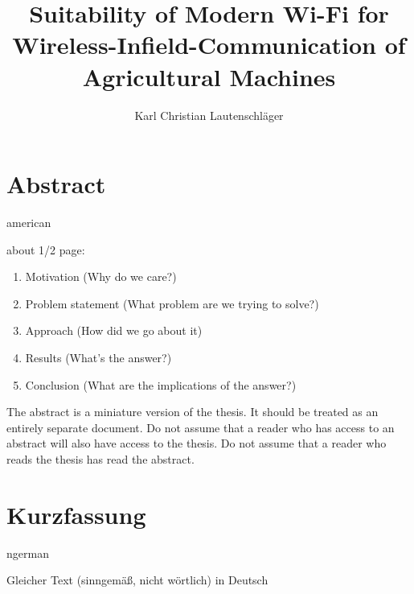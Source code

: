 \documentclass[]{nsm-thesis}
\author{Karl Christian Lautenschläger}
\title{Suitability of Modern Wi-Fi for Wireless-Infield-Communication of Agricultural Machines}
\begin{document}

\maketitle

\cleardoublepage


\chapter*{Abstract}
\begin{otherlanguage*}{american}

about 1/2 page:
\begin{enumerate}
    \item Motivation (Why do we care?)
    \item Problem statement (What problem are we trying to solve?)
    \item Approach (How did we go about it)
    \item Results (What's the answer?)
    \item Conclusion (What are the implications of the answer?)
\end{enumerate}

The abstract is a miniature version of the thesis.
It should be treated as an entirely separate document.
Do not assume that a reader who has access to an abstract will also have access to the thesis.
Do not assume that a reader who reads the thesis has read the abstract.

\end{otherlanguage*}


\chapter*{Kurzfassung}
\begin{otherlanguage*}{ngerman}

Gleicher Text (sinngemäß, nicht wörtlich) in Deutsch

\end{otherlanguage*}
\acresetall

\cleardoublepage
\tableofcontents
{}
\end{document}

